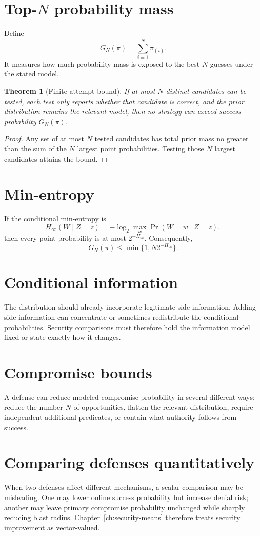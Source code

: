 \documentclass[11pt,oneside]{book}
\newtheorem{theorem}{Theorem}[chapter]
\theoremstyle{definition}
\theoremstyle{remark}
\newcommand{\Prb}{\operatorname{Pr}}
\begin{document}
\section{Top-$N$ probability mass}
\label{sec:top-n}
Define
\[
G_N(\pi)=\sum_{i=1}^{N}\pi_{(i)}.
\]
It measures how much probability mass is exposed to the best $N$ guesses under the stated model.

\begin{theorem}[Finite-attempt bound]
If at most $N$ distinct candidates can be tested, each test only reports whether that candidate is correct, and the prior distribution remains the relevant model, then no strategy can exceed success probability $G_N(\pi)$.
\end{theorem}

\begin{proof}
Any set of at most $N$ tested candidates has total prior mass no greater than the sum of the $N$ largest point probabilities. Testing those $N$ largest candidates attains the bound.
\end{proof}

\section{Min-entropy}
If the conditional min-entropy is
\[
H_\infty(W\mid Z=z)=-\log_2\max_w\Prb(W=w\mid Z=z),
\]
then every point probability is at most $2^{-H_\infty}$. Consequently,
\[
G_N(\pi)\le \min\{1,N2^{-H_\infty}\}.
\]

\section{Conditional information}
The distribution should already incorporate legitimate side information. Adding side information can concentrate or sometimes redistribute the conditional probabilities. Security comparisons must therefore hold the information model fixed or state exactly how it changes.

\section{Compromise bounds}
A defense can reduce modeled compromise probability in several different ways: reduce the number $N$ of opportunities, flatten the relevant distribution, require independent additional predicates, or contain what authority follows from success.

\section{Comparing defenses quantitatively}
When two defenses affect different mechanisms, a scalar comparison may be misleading. One may lower online success probability but increase denial risk; another may leave primary compromise probability unchanged while sharply reducing blast radius. Chapter~\ref{ch:security-means} therefore treats security improvement as vector-valued.
\end{document}

